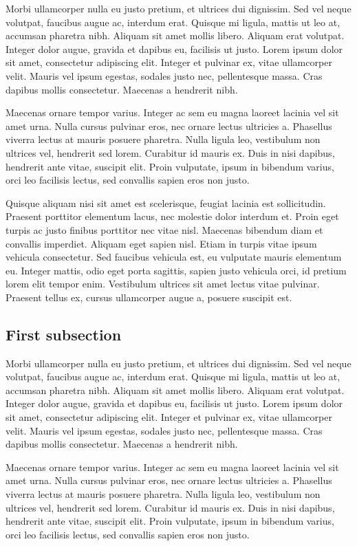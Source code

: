 Morbi ullamcorper nulla eu justo pretium, et ultrices dui dignissim. Sed vel neque volutpat, faucibus augue ac, interdum erat. Quisque mi ligula, mattis ut leo at, accumsan pharetra nibh. Aliquam sit amet mollis libero. Aliquam erat volutpat. Integer dolor augue, gravida et dapibus eu, facilisis ut justo. Lorem ipsum dolor sit amet, consectetur adipiscing elit. Integer et pulvinar ex, vitae ullamcorper velit. Mauris vel ipsum egestas, sodales justo nec, pellentesque massa. Cras dapibus mollis consectetur. Maecenas a hendrerit nibh.

Maecenas ornare tempor varius. Integer ac sem eu magna laoreet lacinia vel sit amet urna. Nulla cursus pulvinar eros, nec ornare lectus ultricies a. Phasellus viverra lectus at mauris posuere pharetra. Nulla ligula leo, vestibulum non ultrices vel, hendrerit sed lorem. Curabitur id mauris ex. Duis in nisi dapibus, hendrerit ante vitae, suscipit elit. Proin vulputate, ipsum in bibendum varius, orci leo facilisis lectus, sed convallis sapien eros non justo.

Quisque aliquam nisi sit amet est scelerisque, feugiat lacinia est sollicitudin. Praesent porttitor elementum lacus, nec molestie dolor interdum et. Proin eget turpis ac justo finibus porttitor nec vitae nisl. Maecenas bibendum diam et convallis imperdiet. Aliquam eget sapien nisl. Etiam in turpis vitae ipsum vehicula consectetur. Sed faucibus vehicula est, eu vulputate mauris elementum eu. Integer mattis, odio eget porta sagittis, sapien justo vehicula orci, id pretium lorem elit tempor enim. Vestibulum ultrices sit amet lectus vitae pulvinar. Praesent tellus ex, cursus ullamcorper augue a, posuere suscipit est.

\subsection{First subsection}

Morbi ullamcorper nulla eu justo pretium, et ultrices dui dignissim. Sed vel neque volutpat, faucibus augue ac, interdum erat. Quisque mi ligula, mattis ut leo at, accumsan pharetra nibh. Aliquam sit amet mollis libero. Aliquam erat volutpat. Integer dolor augue, gravida et dapibus eu, facilisis ut justo. Lorem ipsum dolor sit amet, consectetur adipiscing elit. Integer et pulvinar ex, vitae ullamcorper velit. Mauris vel ipsum egestas, sodales justo nec, pellentesque massa. Cras dapibus mollis consectetur. Maecenas a hendrerit nibh.

Maecenas ornare tempor varius. Integer ac sem eu magna laoreet lacinia vel sit amet urna. Nulla cursus pulvinar eros, nec ornare lectus ultricies a. Phasellus viverra lectus at mauris posuere pharetra. Nulla ligula leo, vestibulum non ultrices vel, hendrerit sed lorem. Curabitur id mauris ex. Duis in nisi dapibus, hendrerit ante vitae, suscipit elit. Proin vulputate, ipsum in bibendum varius, orci leo facilisis lectus, sed convallis sapien eros non justo.

